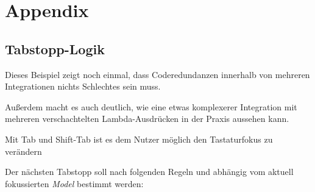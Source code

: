
\chapter{Appendix}
\section{Tabstopp-Logik}


Dieses Beispiel zeigt noch einmal, dass Coderedundanzen innerhalb
von mehreren Integrationen nichts Schlechtes sein muss.

Außerdem macht es auch deutlich, wie eine etwas komplexerer Integration mit
mehreren verschachtelten Lambda-Ausdrücken in der Praxis aussehen kann.

Mit Tab und Shift-Tab ist es dem Nutzer möglich den Tastaturfokus zu
verändern

Der nächsten Tabstopp soll nach folgenden Regeln und abhängig vom aktuell
fokussierten \textit{Model} bestimmt werden:

